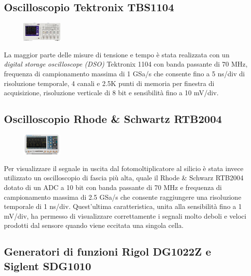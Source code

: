 \documentclass[journal]{IEEEtran}
\begin{document}
\subsection{\textbf{Oscilloscopio Tektronix TBS1104}}

\begin{figure}[h!]
  \centering
  \includegraphics[width=0.18\textwidth]{lab-reports/Schematics-and-graphics/TEK Osc.png}
\end{figure}

La maggior parte delle misure di tensione e tempo è stata realizzata con un \textit{digital storage oscilloscope (DSO)} Tektronix 1104 con banda passante di 70 MHz, frequenza di campionamento massima di 1 GSa/s che consente fino a 5 ns/div di risoluzione temporale, 4 canali e 2.5K punti di memoria per finestra di acquisizione, risoluzione verticale di 8 bit e sensibilità fino a 10 mV/div. \cite{A}

\subsection{\textbf{Oscilloscopio Rhode \& Schwartz RTB2004}}

\begin{figure}[h!]
  \centering
  \includegraphics[width=0.18\textwidth]{lab-reports/Schematics-and-graphics/RS Osc.png}
\end{figure}

Per visualizzare il segnale in uscita dal fotomoltiplicatore al silicio è stata invece utilizzato un oscilloscopio di fascia più alta, quale il Rhode \& Schwarz RTB2004 dotato di un ADC a 10 bit con banda passante di 70 MHz e frequenza di campionamento massima di 2.5 GSa/s che consente raggiungere una risoluzione temporale di 1 ns/div. Quest'ultima caratteristica, unita alla sensibilità fino a 1 mV/div, ha permesso di visualizzare correttamente i segnali molto deboli e veloci prodotti dal sensore quando viene eccitata una singola cella. \cite{B}

\subsection{\textbf{Generatori di funzioni Rigol DG1022Z e Siglent SDG1010}}
\end{document}
